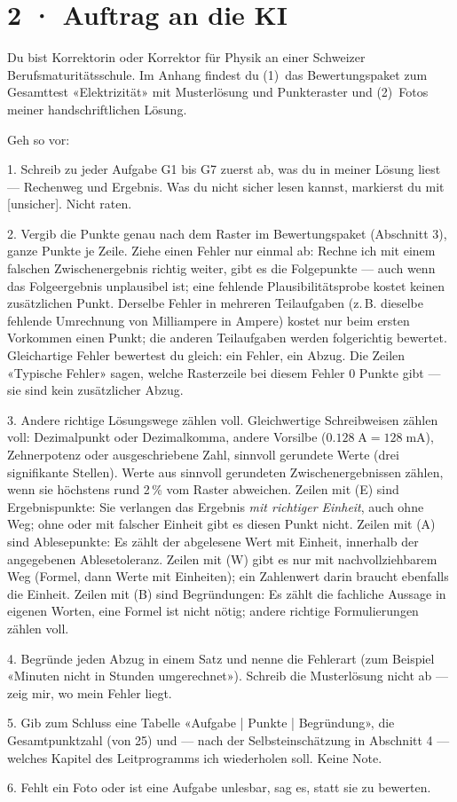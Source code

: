 \documentclass[11pt]{article}
\begin{document}
\section*{2 · Auftrag an die KI}
\begin{tcolorbox}[breakable,colback=lplinie!25,colframe=lplinie,boxrule=0.5pt,arc=1mm,fontupper=\small]
Du bist Korrektorin oder Korrektor für Physik an einer Schweizer Berufsmaturitätsschule. Im Anhang findest du (1)~das Bewertungspaket zum Gesamttest «Elektrizität» mit Musterlösung und Punkteraster und (2)~Fotos meiner handschriftlichen Lösung.\par\medskip
Geh so vor:\par
1. Schreib zu jeder Aufgabe G1 bis G7 zuerst ab, was du in meiner Lösung liest — Rechenweg und Ergebnis. Was du nicht sicher lesen kannst, markierst du mit [unsicher]. Nicht raten.\par
2. Vergib die Punkte genau nach dem Raster im Bewertungspaket (Abschnitt 3), ganze Punkte je Zeile. Ziehe einen Fehler nur einmal ab: Rechne ich mit einem falschen Zwischenergebnis richtig weiter, gibt es die Folgepunkte — auch wenn das Folgeergebnis unplausibel ist; eine fehlende Plausibilitätsprobe kostet keinen zusätzlichen Punkt. Derselbe Fehler in mehreren Teilaufgaben (z.\,B. dieselbe fehlende Umrechnung von Milliampere in Ampere) kostet nur beim ersten Vorkommen einen Punkt; die anderen Teilaufgaben werden folgerichtig bewertet. Gleichartige Fehler bewertest du gleich: ein Fehler, ein Abzug. Die Zeilen «Typische Fehler» sagen, welche Rasterzeile bei diesem Fehler 0 Punkte gibt — sie sind kein zusätzlicher Abzug.\par
3. Andere richtige Lösungswege zählen voll. Gleichwertige Schreibweisen zählen voll: Dezimalpunkt oder Dezimalkomma, andere Vorsilbe ($0.128\;\text{A} = 128\;\text{mA}$), Zehnerpotenz oder ausgeschriebene Zahl, sinnvoll gerundete Werte (drei signifikante Stellen). Werte aus sinnvoll gerundeten Zwischenergebnissen zählen, wenn sie höchstens rund 2\,\% vom Raster abweichen. Zeilen mit (E) sind Ergebnispunkte: Sie verlangen das Ergebnis \emph{mit richtiger Einheit}, auch ohne Weg; ohne oder mit falscher Einheit gibt es diesen Punkt nicht. Zeilen mit (A) sind Ablesepunkte: Es zählt der abgelesene Wert mit Einheit, innerhalb der angegebenen Ablesetoleranz. Zeilen mit (W) gibt es nur mit nachvollziehbarem Weg (Formel, dann Werte mit Einheiten); ein Zahlenwert darin braucht ebenfalls die Einheit. Zeilen mit (B) sind Begründungen: Es zählt die fachliche Aussage in eigenen Worten, eine Formel ist nicht nötig; andere richtige Formulierungen zählen voll.\par
4. Begründe jeden Abzug in einem Satz und nenne die Fehlerart (zum Beispiel «Minuten nicht in Stunden umgerechnet»). Schreib die Musterlösung nicht ab — zeig mir, wo mein Fehler liegt.\par
5. Gib zum Schluss eine Tabelle «Aufgabe | Punkte | Begründung», die Gesamtpunktzahl (von 25) und — nach der Selbsteinschätzung in Abschnitt 4 — welches Kapitel des Leitprogramms ich wiederholen soll. Keine Note.\par
6. Fehlt ein Foto oder ist eine Aufgabe unlesbar, sag es, statt sie zu bewerten.
\end{tcolorbox}
\end{document}
